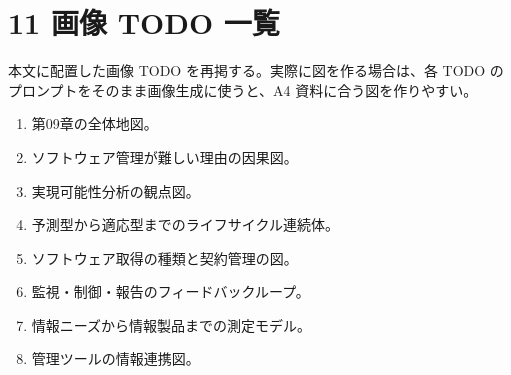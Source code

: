 \documentclass[a4paper,11pt]{ltjsarticle}
\begin{document}
\section{11 画像 TODO 一覧}
本文に配置した画像 TODO を再掲する。実際に図を作る場合は、各 TODO のプロンプトをそのまま画像生成に使うと、A4 資料に合う図を作りやすい。

\begin{enumerate}[leftmargin=2em]
  \item 第09章の全体地図。
  \item ソフトウェア管理が難しい理由の因果図。
  \item 実現可能性分析の観点図。
  \item 予測型から適応型までのライフサイクル連続体。
  \item ソフトウェア取得の種類と契約管理の図。
  \item 監視・制御・報告のフィードバックループ。
  \item 情報ニーズから情報製品までの測定モデル。
  \item 管理ツールの情報連携図。
\end{enumerate}
\end{document}
